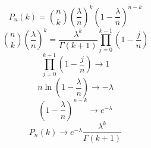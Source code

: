 \documentclass{article}
\begin{document}
\[
P_n(k)=\binom{n}{k}\left(\frac{\lambda}{n}\right)^k\left(1-\frac{\lambda}{n}\right)^{n-k}
\]
\[
\binom{n}{k}\left(\frac{\lambda}{n}\right)^k=\frac{\lambda^k}{\Gamma(k+1)}\prod_{j=0}^{k-1}\left(1-\frac{j}{n}\right)
\]
\[
\prod_{j=0}^{k-1}\left(1-\frac{j}{n}\right)\to1
\]
\[
n\ln\left(1-\frac{\lambda}{n}\right)\to-\lambda
\]
\[
\left(1-\frac{\lambda}{n}\right)^{n-k}\to e^{-\lambda}
\]
\[
P_n(k)\to e^{-\lambda}\frac{\lambda^k}{\Gamma(k+1)}
\]
\end{document}
